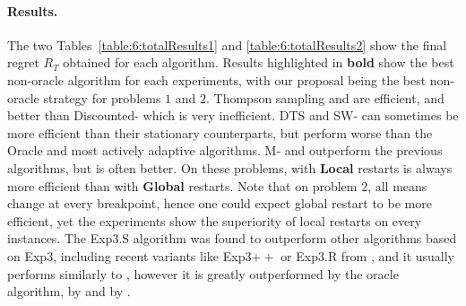 


\paragraph{Results.}
\label{sub:6:NumericalResults}


The two Tables~\ref{table:6:totalResults1} and \ref{table:6:totalResults2} show the final regret $R_T$ obtained for each algorithm.
Results highlighted in \textbf{bold} show the best non-oracle algorithm for each experiments,
with our proposal being the best non-oracle strategy for problems $1$ and $2$.
Thompson sampling and \klUCB{} are efficient,
and better than Discounted-\klUCB{} which is very inefficient.
DTS and SW-\klUCB{} can sometimes be more efficient than their stationary counterparts, but perform worse than the Oracle and most actively adaptive algorithms.
M-\klUCB{} and \CUSUMklUCB{} outperform the previous algorithms, but \GLRklUCB{} is often better.
%
On these problems, \GLRklUCB{} with \textbf{Local} restarts is always more efficient than with \textbf{Global} restarts. Note that on problem 2, all means change at every breakpoint, hence one could expect global restart to be more efficient, yet the experiments show the superiority of local restarts on every instances.
The Exp3.S algorithm was found to outperform other algorithms based on Exp3, including recent variants like Exp3$++$ \cite{Seldin17} or Exp3.R from \cite{Allesiardo17},
and it usually performs similarly to \MklUCB, however it is greatly outperformed by the oracle algorithm, by \GLRklUCB{} and by \CUSUMklUCB.


